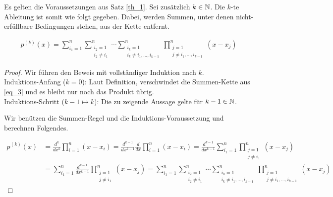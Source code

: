 \begin{corollary}

Es gelten die Voraussetzungen aus Satz \ref{th_1}.
Sei zusätzlich $k \in \mathbb{N}$.
Die $k$-te Ableitung ist somit wie folgt gegeben.
Dabei, werden Summen, unter denen nicht-erfüllbare Bedingungen stehen, aus der Kette entfernt.

\begin{align} \label{eq_3}
  p^{(k)}(x)
  =
  \sum_{i_1 = 1}^n
  \sum_{\substack{i_2 = 1 \\ i_2 \neq i_1}}^n
  \cdots
  \sum_{\substack{i_k = 1 \\ i_k \neq i_1, \ldots, i_{k-1}}}^n
  \prod_{\substack{j = 1 \\ j \neq i_1, \ldots, i_{k-1}}}^n
  (x - x_j)
\end{align}

\end{corollary}

\begin{proof}

Wir führen den Beweis mit vollständiger Induktion nach $k$. \\

Induktions-Anfang ($k = 0$):
Laut Definition, verschwindet die Summen-Kette aus \eqref{eq_3} und es bleibt nur noch das Produkt übrig. \\

Induktions-Schritt ($k-1 \mapsto k$):
Die zu zeigende Aussage gelte für $k-1 \in \mathbb{N}$.

Wir benützen die Summen-Regel und die Induktions-Voraussetzung und berechnen Folgendes.

\begin{align*}
  p^{(k)}(x)
  & =
  \frac{d^k}{dx^k}
  \prod_{i=1}^{n} (x - x_i)
  =
  \frac{d^{k-1}}{dx^{k-1}}
  \frac{d}{dx}
  \prod_{i=1}^{n} (x - x_i)
  =
  \frac{d^{k-1}}{dx^{k-1}}
  \sum_{i_1 = 1}^n
  \prod_{\substack{j=1 \\ j \neq i_1}}^n
  (x - x_j) \\
  & =
  \sum_{i_1 = 1}^n
  \frac{d^{k-1}}{dx^{k-1}}
  \prod_{\substack{j=1 \\ j \neq i_1}}^n
  (x - x_j)
  =
  \sum_{i_1 = 1}^n
  \sum_{\substack{i_2 = 1 \\ i_2 \neq i_1}}^n
  \cdots
  \sum_{\substack{i_k = 1 \\ i_k \neq i_1, \ldots, i_{k-1}}}^n
  \prod_{\substack{j = 1 \\ j \neq i_1, \ldots, i_{k-1}}}^n
  (x - x_j)
\end{align*}

\end{proof}

